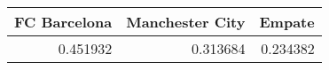 \begin{tabular}{rrr}
\hline
   FC Barcelona &   Manchester City &   Empate \\
\hline
       0.451932 &          0.313684 & 0.234382 \\
\hline
\end{tabular}